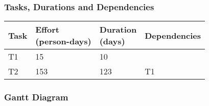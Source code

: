 \subsubsection{Tasks, Durations and Dependencies}
\lipsum[100]
\begin{center}
	\begin{tabulary}{\linewidth\tymin=70pt}{Y{2cm}|Y{2.5cm}|Y{2cm}|Y{2cm}}
		\textbf{Task} & \textbf{Effort\newline(person-days)} & \textbf{Duration\newline(days)} & \textbf{Dependencies} \\ \hline
		T1 & 15 & 10 & \\ \hline
		T2 & 153 & 123 & T1 \\
	\end{tabulary}
\end{center}
%
\subsubsection{Gantt Diagram}
\lipsum[100]
\begin{center}
	\begin{ganttchart}[hgrid=true,vgrid={draw=none, dotted}, x unit=4mm]{1}{24}
		 \\
		 \\
		 \\
		 \\
		 \\
	\end{ganttchart}
\end{center}
%